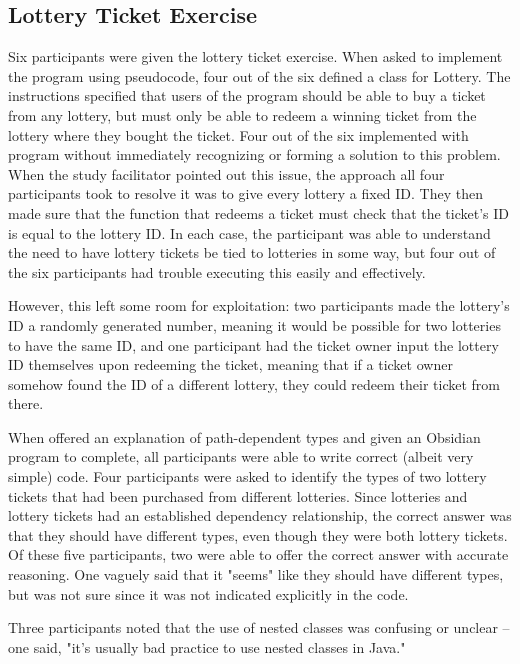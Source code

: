 \documentclass[sigplan,10pt,review]{acmart}\settopmatter{printfolios=true}
\begin{document}
\subsection{Lottery Ticket Exercise}	
	
Six participants were given the lottery ticket exercise. When asked to implement the program using pseudocode, four out of the six defined 
a class for Lottery. The instructions specified that users of the program should be able to buy a ticket from any lottery, but must only be 
able to redeem a winning ticket from the lottery where they bought the ticket. Four out of the six implemented with program without 
immediately recognizing or forming a solution to this problem. When the study facilitator pointed out this issue, the approach all four 
participants took to resolve it was to give every lottery a fixed ID. They then made sure that the function that redeems a ticket must check 
that the ticket's ID is equal to the lottery ID. In each case, the participant was able to understand the need to have lottery tickets be tied to 
lotteries in some way, but four out of the six participants had trouble executing this easily and effectively. 

However, this left some room for exploitation: two participants made the lottery's ID a randomly generated number, meaning it would be 
possible for two lotteries to have the same ID, and one  participant had the ticket owner input the lottery ID themselves upon redeeming 
the ticket, meaning that if a ticket owner somehow found the ID of a different lottery, they could redeem their ticket from there.

When offered an explanation of path-dependent types and given an Obsidian program to complete, all participants were able to write 
correct (albeit very simple) code. Four participants were asked to identify the types of two lottery tickets that had been purchased from different 
lotteries. Since lotteries and lottery tickets had an established dependency relationship, the correct answer was that they should have different 
types, even though they were both lottery tickets. Of these five participants, two were able to offer the correct answer with accurate reasoning. 
One vaguely said that it "seems" like they should have different types, but was not sure since it was not indicated explicitly in the code. 

Three participants noted that the use of nested classes was confusing or unclear -- one said, "it's usually bad practice to use nested 
classes in Java."
\end{document}
